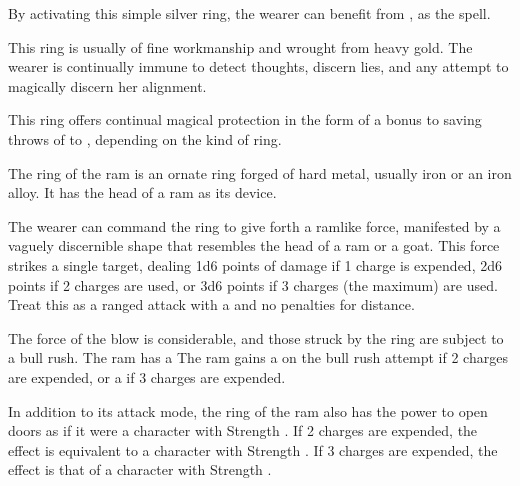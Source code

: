 
 By activating this simple silver ring, the wearer can benefit from , as the spell. 


 This ring is usually of fine workmanship and wrought from heavy gold. The wearer is continually immune to detect thoughts, discern lies, and any attempt to magically discern her alignment.


 This ring offers continual magical protection in the form of a bonus to saving throws of  to , depending on the kind of ring.


 The ring of the ram is an ornate ring forged of hard metal, usually iron or an iron alloy. It has the head of a ram as its device.

The wearer can command the ring to give forth a ramlike force, manifested by a vaguely discernible shape that resembles the head of a ram or a goat. This force strikes a single target, dealing 1d6 points of  damage if 1 charge is expended, 2d6 points if 2 charges are used, or 3d6 points if 3 charges (the maximum) are used. Treat this as a ranged attack with a  and no penalties for distance.

The force of the blow is considerable, and those struck by the ring are subject to a bull rush. The ram has a  The ram gains a  on the bull rush attempt if 2 charges are expended, or a  if 3 charges are expended.

In addition to its attack mode, the ring of the ram also has the power to open doors as if it were a character with Strength . If 2 charges are expended, the effect is equivalent to a character with Strength . If 3 charges are expended, the effect is that of a character with Strength .

